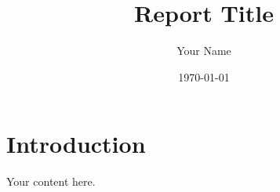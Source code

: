 \documentclass[11pt,a4paper]{article}
\title{Report Title}
\author{Your Name}
\date{\today}
\begin{document}
\maketitle

\section{Introduction}

Your content here.
\end{document}
